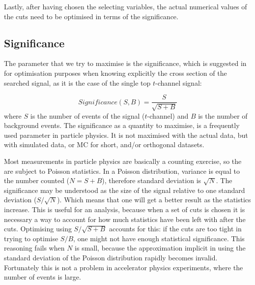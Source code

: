 Lastly, after having chosen the selecting variables, the actual numerical values of the cuts need to be optimised in terms of the significance.

\subsection*{Significance}
The parameter that we try to maximise is the significance, which is suggested in~\cite{Punzi:2003bu} for optimisation purposes when knowing explicitly the cross section of the searched signal, as it is the case of the single top $t$-channel signal:

\begin{equation*}
Significance(S,B)=\frac{S}{\sqrt{S+B}}
\end{equation*}
where $S$ is the number of events of the signal ($t$-channel) and $B$ is the number of background events. The significance as a quantity to maximise, is  a frequently used parameter in particle physics. It is not maximised with the actual data, but with simulated data, or MC for short, and/or orthogonal datasets.

Most measurements in particle physics are basically a counting exercise, so the are subject to Poisson statistics. In a Poisson distribution, variance is equal to the number counted ($N=S+B$), therefore standard deviation is $\sqrt{N}$. The significance may be understood as the size of the signal relative to one standard deviation ($S/\sqrt{N}$). 
Which means that one will get a better result as the statistics increase. This is useful for an analysis, because when a set of cuts is chosen it is necessary a way to account for how much statistics have been left with after the cuts. Optimising using $S/\sqrt{S+B}$ accounts for this: if the cuts are too tight in trying to optimise $S/B$, one might not have enough statistical significance. This reasoning fails when $N$ is small, because the approximation implicit in using the standard deviation of the Poisson distribution rapidly becomes invalid. Fortunately this is not a problem in accelerator physics experiments, where the number of events is large.



